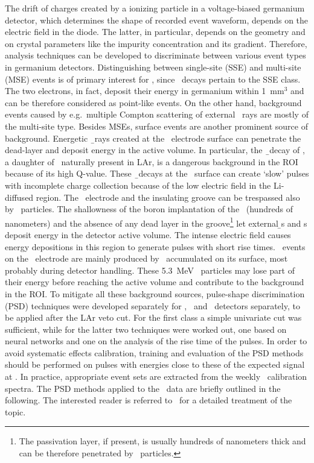The drift of charges created by a ionizing particle in a voltage-biased germanium
detector, which determines the shape of recorded event waveform, depends on the electric
field in the diode. The latter, in particular, depends on the geometry and on crystal
parameters like the impurity concentration and its gradient. Therefore, analysis
techniques can be developed to discriminate between various event types in germanium
detectors. Distinguishing between single-site (SSE) and multi-site (MSE) events is of
primary interest for \gerda, since \onbb\ decays pertain to the SSE class. The two
electrons, in fact, deposit their energy in germanium within 1~mm$^3$ and can be therefore
considered as point-like events. On the other hand, background events caused by
e.g.~multiple Compton scattering of external \g\ rays are mostly of the multi-site type.
Besides MSEs, surface events are another prominent source of background. Energetic \b\
rays created at the \nplus\ electrode surface can penetrate the dead-layer and deposit
energy in the active volume. In particular, the \b\ decay of \kvz, a daughter of \Arh\
naturally present in LAr, is a dangerous background in the ROI because of its high
Q-value. These \b\ decays at the \nplus\ surface can create `slow' pulses with incomplete
charge collection because of the low electric field in the Li-diffused region. The \pplus\
electrode and the insulating groove can be trespassed also by \a\ particles. The
shallowness of the boron implantation of the \pplus\ (hundreds of nanometers) and the
absence of any dead layer in the groove\footnote{The passivation layer, if present, is
usually hundreds of nanometers thick and can be therefore penetrated by \a\ particles.}
let external \b{}s and \a{}s deposit energy in the detector active volume. The intense
electric field causes energy depositions in this region to generate pulses with short
rise times. \a\ events on the \pplus\ electrode are mainly produced by \Po\ accumulated
on its surface, most probably during detector handling. These 5.3~MeV \a\ particles may
lose part of their energy before reaching the active volume and contribute to the
background in the ROI.
\newpar
To mitigate all these background sources, pulse-shape discrimination (PSD) techniques were
developed separately for \bege, \icoax\ and \scoax\ detectors separately, to be applied
after the LAr veto cut. For the first class a simple univariate cut was sufficient, while
for the latter two techniques were worked out, one based on neural networks and one on the
analysis of the rise time of the pulses.  In order to avoid systematic effects
calibration, training and evaluation of the PSD methods should be performed on pulses with
energies close to these of the expected signal at \qbb.  In practice, appropriate event
sets are extracted from the weekly \Th\ calibration spectra. The PSD methods applied to
the \gerda\ data are briefly outlined in the following. The interested reader is referred
to~\cite{Agostini2021a} for a detailed treatment of the topic. \fillme{define somewhere FEP,
SEP and DEP}

